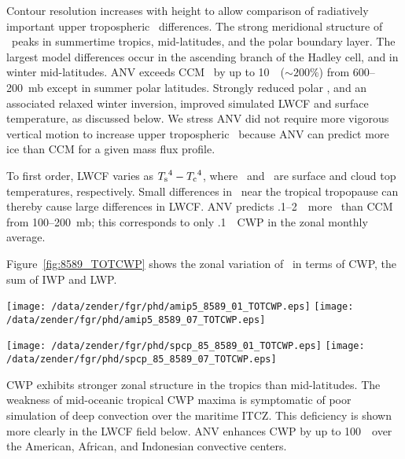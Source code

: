 \documentclass[agums]{aguplus}
\begin{document}
Contour resolution increases with height to allow comparison of
radiatively important upper tropospheric \qc\ differences.
The strong meridional structure of \qc\ peaks in summertime tropics,
mid-latitudes, and the polar boundary layer. 
The largest model differences occur in the ascending branch of
the Hadley cell, and in winter mid-latitudes.
ANV exceeds CCM \qc\ by up to 10~\mgxkg\ ($\sim 200\%$) from
600--200~mb except in summer polar latitudes. 
Strongly reduced polar \qc, and an associated relaxed winter
inversion, improved simulated LWCF and surface temperature, as 
discussed below.    
We stress ANV did not require more vigorous vertical motion to
increase upper tropospheric \qc\ because ANV can predict more ice than
CCM for a given mass flux profile.

To first order, LWCF varies as $\mbox{$T_\mathrm{s}$}^4 - \mbox{$T_\mathrm{c}$}^4$, where \Ts\ and \Tc\
are surface and cloud top temperatures, respectively. 
Small differences in \qc\ near the tropical tropopause can thereby
cause large differences in LWCF.
ANV predicts .1--2~\mgxkg\ more \qc\ than CCM from 100--200~mb;
this corresponds to only .1~\gxmS\ CWP in the zonal monthly average. 

Figure~\ref{fig:8589_TOTCWP} shows the zonal variation of \qc\ in
terms of CWP, the sum of IWP and LWP.
\begin{figure*}
\begin{center}
\texttt{[image: /data/zender/fgr/phd/amip5\_8589\_01\_TOTCWP.eps]}%
\texttt{[image: /data/zender/fgr/phd/amip5\_8589\_07\_TOTCWP.eps]}%

\texttt{[image: /data/zender/fgr/phd/spcp\_85\_8589\_01\_TOTCWP.eps]}%
\texttt{[image: /data/zender/fgr/phd/spcp\_85\_8589\_07\_TOTCWP.eps]}%
\end{center}
\caption[Geographic distribution of condensed water path from 
January and July 1985--1989 simulated by CCM and ANV]{
Geographic distribution of condensed water path (\gxmS) from 
(left) January and (right) July 1985--1989 simulated by (top) CCM and
(bottom) ANV: (a) January CCM, (b) July CCM, (c) January ANV, and (d)
July ANV. 
Contour interval is 25~\gxmS. 
\label{fig:8589_TOTCWP}}   
\end{figure*}
CWP exhibits stronger zonal structure in the tropics than
mid-latitudes. 
The weakness of mid-oceanic tropical CWP maxima is symptomatic of poor
simulation of deep convection over the maritime ITCZ. 
This deficiency is shown more clearly in the LWCF field below.
ANV enhances CWP by up to 100~\gxmS\ over the American, African, and
Indonesian convective centers.
\end{document}
